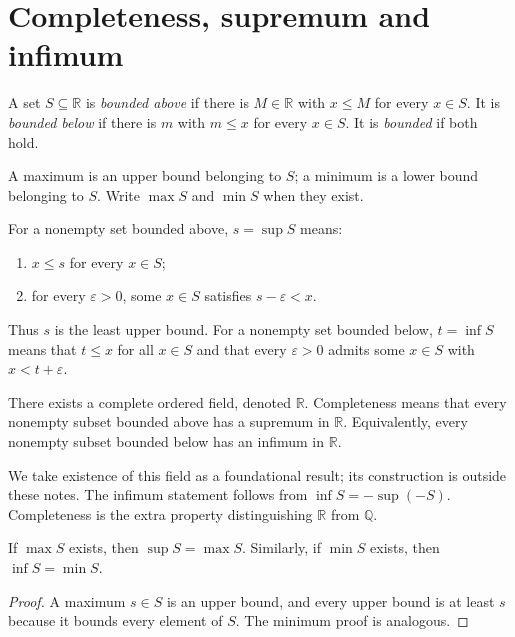 \section{Completeness, supremum and infimum}
\begin{definition}
A set $S\subseteq\mathbb R$ is \emph{bounded above} if there is $M\in\mathbb R$
with $x\leq M$ for every $x\in S$. It is \emph{bounded below} if there is $m$
with $m\leq x$ for every $x\in S$. It is \emph{bounded} if both hold.

A maximum is an upper bound belonging to $S$; a minimum is a lower bound
belonging to $S$. Write $\max S$ and $\min S$ when they exist.
\end{definition}

\begin{definition}
For a nonempty set bounded above, $s=\sup S$ means:
\begin{enumerate}
\item $x\leq s$ for every $x\in S$;
\item for every $\varepsilon>0$, some $x\in S$ satisfies $s-\varepsilon<x$.
\end{enumerate}
Thus $s$ is the least upper bound. For a nonempty set bounded below,
$t=\inf S$ means that $t\leq x$ for all $x\in S$ and that every
$\varepsilon>0$ admits some $x\in S$ with $x<t+\varepsilon$.
\end{definition}

\begin{theorem}
There exists a complete ordered field, denoted $\mathbb R$.
Completeness means that every nonempty subset bounded above has a supremum
in $\mathbb R$. Equivalently, every nonempty subset bounded below has an
infimum in $\mathbb R$.
\end{theorem}
We take existence of this field as a foundational result; its construction
is outside these notes. The infimum statement follows from
$\inf S=-\sup(-S)$. Completeness is the extra property distinguishing
$\mathbb R$ from $\mathbb Q$.

\begin{proposition}
If $\max S$ exists, then $\sup S=\max S$. Similarly, if $\min S$ exists,
then $\inf S=\min S$.
\end{proposition}
\begin{proof}
A maximum $s\in S$ is an upper bound, and every upper bound is at least $s$
because it bounds every element of $S$. The minimum proof is analogous.
\end{proof}

